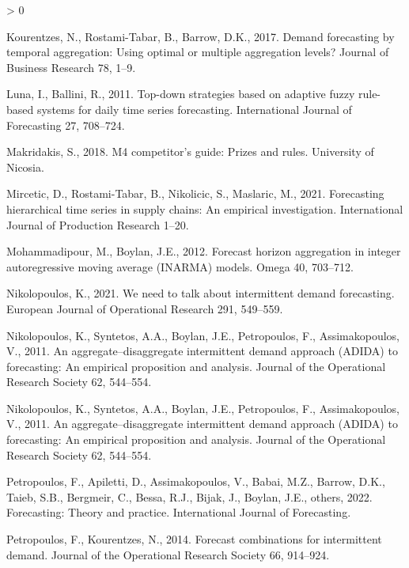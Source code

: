 \documentclass[]{elsarticle} %
\newlength{\cslhangindent}
\newenvironment{CSLReferences}[2] %
 {%
  \setlength{\parindent}{0pt}
  \ifodd #1 \everypar{\setlength{\hangindent}{\cslhangindent}}\ignorespaces\fi
  \ifnum #2 > 0
  \setlength{\parskip}{#2\baselineskip}
  \fi
 }%
 {}
\begin{document}
\begin{CSLReferences}{1}{0}
\leavevmode\hypertarget{ref-kourentzes2017demand}{}%
Kourentzes, N., Rostami-Tabar, B., Barrow, D.K., 2017. Demand
forecasting by temporal aggregation: Using optimal or multiple
aggregation levels? Journal of Business Research 78, 1--9.

\leavevmode\hypertarget{ref-luna2011top}{}%
Luna, I., Ballini, R., 2011. Top-down strategies based on adaptive fuzzy
rule-based systems for daily time series forecasting. International
Journal of Forecasting 27, 708--724.

\leavevmode\hypertarget{ref-Makridakis2018}{}%
Makridakis, S., 2018. M4 competitor's guide: Prizes and rules.
University of Nicosia.

\leavevmode\hypertarget{ref-mircetic2021forecasting}{}%
Mircetic, D., Rostami-Tabar, B., Nikolicic, S., Maslaric, M., 2021.
Forecasting hierarchical time series in supply chains: An empirical
investigation. International Journal of Production Research 1--20.

\leavevmode\hypertarget{ref-mohammadipour2012forecast}{}%
Mohammadipour, M., Boylan, J.E., 2012. Forecast horizon aggregation in
integer autoregressive moving average (INARMA) models. Omega 40,
703--712.

\leavevmode\hypertarget{ref-nikolopoulos2021we}{}%
Nikolopoulos, K., 2021. We need to talk about intermittent demand
forecasting. European Journal of Operational Research 291, 549--559.

\leavevmode\hypertarget{ref-nikolopoulos2011aggregate}{}%
Nikolopoulos, K., Syntetos, A.A., Boylan, J.E., Petropoulos, F.,
Assimakopoulos, V., 2011. An aggregate--disaggregate intermittent demand
approach ({ADIDA}) to forecasting: An empirical proposition and
analysis. Journal of the Operational Research Society 62, 544--554.

\leavevmode\hypertarget{ref-nikolopoulos2011aggregate}{}%
Nikolopoulos, K., Syntetos, A.A., Boylan, J.E., Petropoulos, F.,
Assimakopoulos, V., 2011. An aggregate--disaggregate intermittent demand
approach ({ADIDA}) to forecasting: An empirical proposition and
analysis. Journal of the Operational Research Society 62, 544--554.

\leavevmode\hypertarget{ref-petropoulos2022forecasting}{}%
Petropoulos, F., Apiletti, D., Assimakopoulos, V., Babai, M.Z., Barrow,
D.K., Taieb, S.B., Bergmeir, C., Bessa, R.J., Bijak, J., Boylan, J.E.,
others, 2022. Forecasting: Theory and practice. International Journal of
Forecasting.

\leavevmode\hypertarget{ref-petropoulos2014forecast}{}%
Petropoulos, F., Kourentzes, N., 2014. Forecast combinations for
intermittent demand. Journal of the Operational Research Society 66,
914--924.


\end{CSLReferences}
\end{document}
